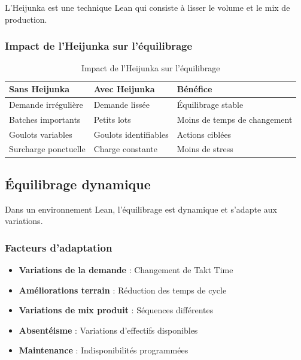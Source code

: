 \documentclass[12pt,a4paper]{article}
\newenvironment{methodbox}[1]
  {\begin{tcolorbox}[colback=blue!5!white, colframe=methodcolor, title=#1]\small}
  {\end{tcolorbox}}
\begin{document}
L'Heijunka est une technique Lean qui consiste à lisser le volume et le mix de production.

\subsubsection{Impact de l'Heijunka sur l'équilibrage}

\begin{table}[H]
\centering
\begin{tabular}{|p{4cm}|p{4cm}|p{4cm}|}
\hline
\textbf{Sans Heijunka} & \textbf{Avec Heijunka} & \textbf{Bénéfice} \\
\hline
Demande irrégulière & Demande lissée & Équilibrage stable \\
\hline
Batches importants & Petits lots & Moins de temps de changement \\
\hline
Goulots variables & Goulots identifiables & Actions ciblées \\
\hline
Surcharge ponctuelle & Charge constante & Moins de stress \\
\hline
\end{tabular}
\caption{Impact de l'Heijunka sur l'équilibrage}
\end{table}

\subsection{Équilibrage dynamique}

Dans un environnement Lean, l'équilibrage est dynamique et s'adapte aux variations.

\subsubsection{Facteurs d'adaptation}

\begin{methodbox}{Facteurs influençant l'équilibrage dynamique}
\begin{itemize}
    \item \textbf{Variations de la demande} : Changement de Takt Time
    \item \textbf{Améliorations terrain} : Réduction des temps de cycle
    \item \textbf{Variations de mix produit} : Séquences différentes
    \item \textbf{Absentéisme} : Variations d'effectifs disponibles
    \item \textbf{Maintenance} : Indisponibilités programmées
\end{itemize}
\end{methodbox}
\end{document}

